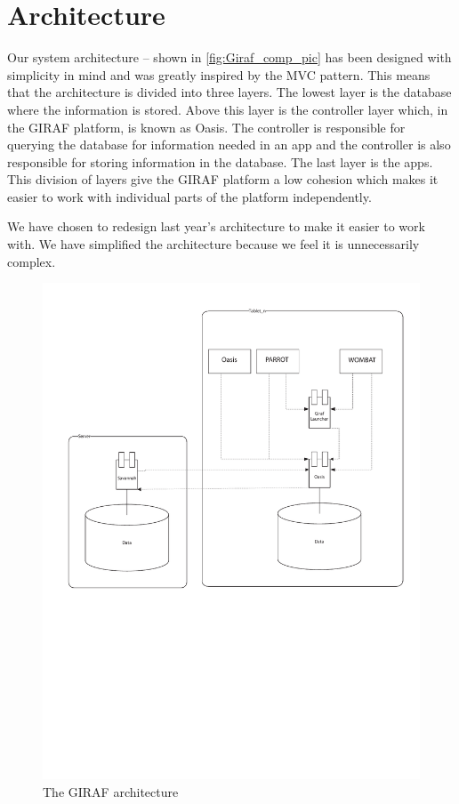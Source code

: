 \section{Architecture}
Our system architecture -- shown in \autoref{fig:Giraf_comp_pic} has been designed with simplicity in mind and was greatly inspired by the MVC pattern. This means that the architecture is divided into three layers. The lowest layer is the database where the information is stored. Above this layer is the controller layer which, in the GIRAF platform, is known as Oasis. The controller is responsible for querying the database for information needed in an app and the controller is also responsible for storing information in the database. The last layer is the apps. This division of layers give the GIRAF platform a low cohesion which makes it easier to work with individual parts of the platform independently.

We have chosen to redesign last year's architecture \cite{LastYearsArchitecture} to make it easier to work with. We have simplified the architecture because we feel it is unnecessarily complex.

\begin{figure}
	\centering
		\includegraphics[width=\textwidth]{gfx/Giraf_comp.pdf}
	\caption{The GIRAF architecture}
	\label{fig:Giraf_comp_pic}
\end{figure}
